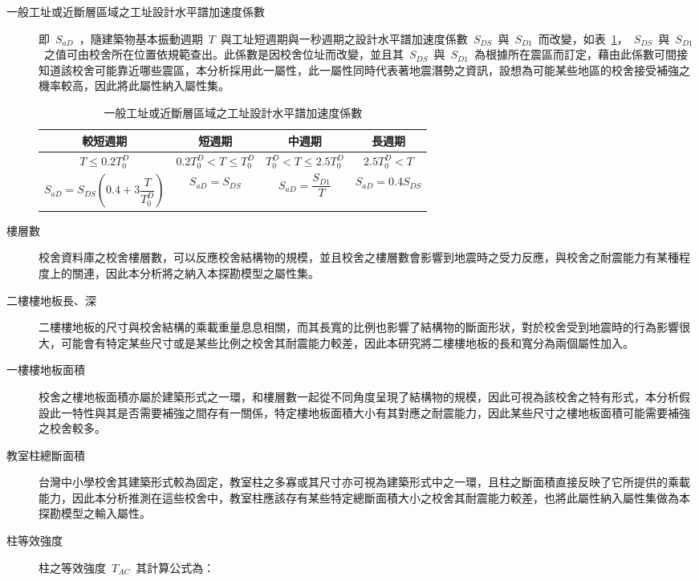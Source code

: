 \begin{description}
  \item [一般工址或近斷層區域之工址設計水平譜加速度係數]
  \cite{內政部營建署編輯委員會2005建築物耐震設計規範及解說} 即~$S_{aD}$~，隨建築物基本振動週期~$T$~與工址短週期與一秒週期之設計水平譜加速度係數~$S_{DS}$~與~$S_{D1}$~而改變，如表~\ref{tab:sad}，~$S_{DS}$~與~$S_{D1}$~之值可由校舍所在位置依規範查出。此係數是因校舍位址而改變，並且其~$S_{DS}$~與~$S_{D1}$~為根據所在震區而訂定，藉由此係數可間接知道該校舍可能靠近哪些震區，本分析採用此一屬性，此一屬性同時代表著地震潛勢之資訊，設想為可能某些地區的校舍接受補強之機率較高，因此將此屬性納入屬性集。

{\renewcommand{\arraystretch}{1.5}
\begin{table}[hbtp]
  \begin{center}
    \caption{一般工址或近斷層區域之工址設計水平譜加速度係數}
    \label{tab:sad}
    \begin{tabular}{c c c c}
      \hline
       較短週期 & 短週期 & 中週期 & 長週期 \\
      \hline
       $T \leq 0.2 T^D_0$ &  $0.2 T^D_0 < T \leq T^D_0$ & $T^D_0 < T \leq 2.5 T^D_0$  & $2.5 T^D_0 < T$  \\
       $ S_{aD} = S_{DS}(0.4 + 3 \dfrac{T}{T^D_0}) $ & $ S_{aD} = S_{DS} $ & $ S_{aD} = \dfrac{S_{D1}}{T} $ & $ S_{aD} = 0.4 S_{DS} $ \\
      \hline
      \end{tabular}
  \end{center}
\end{table}
}


  \item [樓層數]
  校舍資料庫之校舍樓層數，可以反應校舍結構物的規模，並且校舍之樓層數會影響到地震時之受力反應，與校舍之耐震能力有某種程度上的關連，因此本分析將之納入本探勘模型之屬性集。
  \item [二樓樓地板長、深]
  二樓樓地板的尺寸與校舍結構的乘載重量息息相關，而其長寬的比例也影響了結構物的斷面形狀，對於校舍受到地震時的行為影響很大，可能會有特定某些尺寸或是某些比例之校舍其耐震能力較差，因此本研究將二樓樓地板的長和寬分為兩個屬性加入。
  \item [一樓樓地板面積]
  校舍之樓地板面積亦屬於建築形式之一環，和樓層數一起從不同角度呈現了結構物的規模，因此可視為該校舍之特有形式，本分析假設此一特性與其是否需要補強之間存有一關係，特定樓地板面積大小有其對應之耐震能力，因此某些尺寸之樓地板面積可能需要補強之校舍較多。
  \item [教室柱總斷面積]
  台灣中小學校舍其建築形式較為固定，教室柱之多寡或其尺寸亦可視為建築形式中之一環，且柱之斷面積直接反映了它所提供的乘載能力，因此本分析推測在這些校舍中，教室柱應該存有某些特定總斷面積大小之校舍其耐震能力較差，也將此屬性納入屬性集做為本探勘模型之輸入屬性。
  \item [柱等效強度]
  柱之等效強度~$T_{AC}$~其計算公式為：


\end{description}
